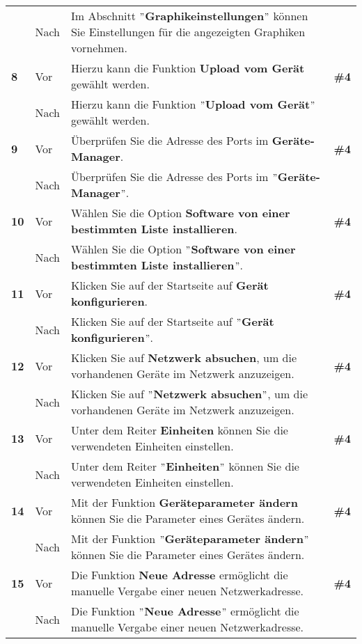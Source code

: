 \begin{longtable}{llp{}l}
& Nach & Im Abschnitt \textbf{$"$Graphikeinstellungen$"$} können Sie Einstellungen für die angezeigten Graphiken vornehmen. & \\
\tablevspace
{ \textbf{8}} & Vor & Hierzu kann die Funktion \textbf{Upload vom Gerät} gewählt werden. & \textbf{\#4}\\
& Nach & Hierzu kann die Funktion \textbf{$"$Upload vom Gerät$"$} gewählt werden. & \\
\tablevspace
{ \textbf{9}} & Vor & Überprüfen Sie die Adresse des Ports im \textbf{Geräte-Manager}. & \textbf{\#4}\\
& Nach & Überprüfen Sie die Adresse des Ports im \textbf{$"$Geräte-Manager$"$}. & \\
\tablevspace
{ \textbf{10}} & Vor & Wählen Sie die Option \textbf{Software von einer bestimmten Liste installieren}. & \textbf{\#4}\\
& Nach & Wählen Sie die Option \textbf{$"$Software von einer bestimmten Liste installieren$"$}. & \\
\tablevspace
{ \textbf{11}} & Vor & Klicken Sie auf der Startseite auf \textbf{Gerät konfigurieren}. & \textbf{\#4}\\
& Nach & Klicken Sie auf der Startseite auf \textbf{$"$Gerät konfigurieren$"$}. & \\
\tablevspace
{ \textbf{12}} & Vor & Klicken Sie auf \textbf{Netzwerk absuchen}, um die vorhandenen Geräte im Netzwerk anzuzeigen. & \textbf{\#4}\\
& Nach & Klicken Sie auf \textbf{$"$Netzwerk absuchen$"$}, um die vorhandenen Geräte im Netzwerk anzuzeigen. & \\
\tablevspace
{ \textbf{13}} & Vor & Unter dem Reiter \textbf{Einheiten} können Sie die verwendeten Einheiten einstellen. & \textbf{\#4}\\
& Nach & Unter dem Reiter \textbf{$"$Einheiten$"$} können Sie die verwendeten Einheiten einstellen. & \\
\tablevspace
{ \textbf{14}} & Vor & Mit der Funktion \textbf{Geräteparameter ändern} können Sie die Parameter eines Gerätes ändern. & \textbf{\#4}\\
& Nach & Mit der Funktion \textbf{$"$Geräteparameter ändern$"$} können Sie die Parameter eines Gerätes ändern. & \\
\tablevspace
{ \textbf{15}} & Vor & Die Funktion \textbf{Neue Adresse} ermöglicht die manuelle Vergabe einer neuen Netzwerkadresse. & \textbf{\#4}\\
& Nach & Die Funktion \textbf{$"$Neue Adresse$"$} ermöglicht die manuelle Vergabe einer neuen Netzwerkadresse. & \\

\end{longtable}
